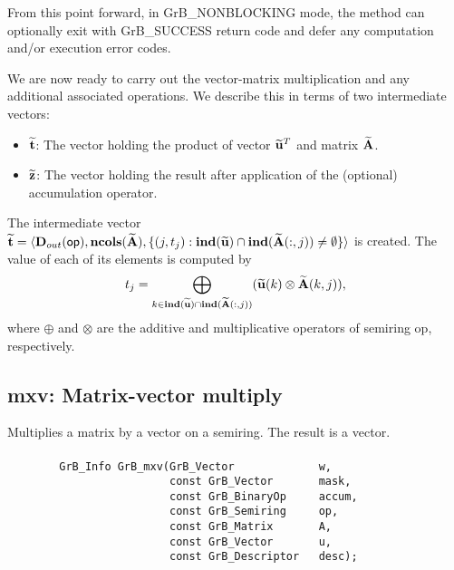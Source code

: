 From this point forward, in {\sf GrB\_NONBLOCKING} mode, the method can 
optionally exit with {\sf GrB\_SUCCESS} return code and defer any computation 
and/or execution error codes.

We are now ready to carry out the vector-matrix multiplication and any additional 
associated operations.  We describe this in terms of two intermediate vectors:
\begin{itemize}
    \item ${\bf \widetilde{t}}$: The vector holding the product of vector
    ${\bf \widetilde{u}}^T$ and matrix ${\bf \widetilde{A}}$.
    \item ${\bf \widetilde{z}}$: The vector holding the result after 
    application of the (optional) accumulation operator.
\end{itemize}

The intermediate vector ${\bf \widetilde{t}} = \langle
\mbox{$\mathbf{D}_{out}$}({\sf op}), \bold{ncols}({\bf \widetilde{A}}),
\{(j,t_j) : \bold{ind}({\bf \widetilde{u}}) \cap
\bold{ind}({\bf \widetilde{A}}(:,j)) \neq \emptyset \} \rangle$
is created.  The value of each of its elements is computed by 
\[t_j = \bigoplus_{k \in \bold{ind}({\bf \widetilde{u}}) \cap
\bold{ind}({\bf \widetilde{A}}(:,j))} ({\bf \widetilde{u}}(k)
\otimes {\bf \widetilde{A}}(k,j)),\] where $\oplus$ and $\otimes$
are the additive and multiplicative operators of semiring {\sf op},
respectively.






\subsection{{\sf mxv}: Matrix-vector multiply}

Multiplies a matrix by a vector on a semiring. The result is a vector.

\paragraph{\syntax}

\begin{verbatim}
        GrB_Info GrB_mxv(GrB_Vector             w,
                         const GrB_Vector       mask,
                         const GrB_BinaryOp     accum,
                         const GrB_Semiring     op,
                         const GrB_Matrix       A,
                         const GrB_Vector       u,
                         const GrB_Descriptor   desc);
\end{verbatim}

